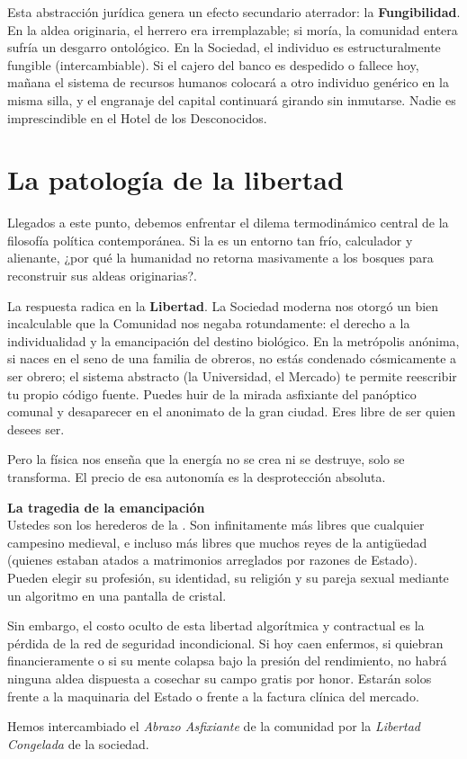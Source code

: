 Esta abstracción jurídica genera un efecto secundario aterrador: la \textbf{Fungibilidad}. En la aldea originaria, el herrero era irremplazable; si moría, la comunidad entera sufría un desgarro ontológico. En la Sociedad, el individuo es estructuralmente fungible (intercambiable). Si el cajero del banco es despedido o fallece hoy, mañana el sistema de recursos humanos colocará a otro individuo genérico en la misma silla, y el engranaje del capital continuará girando sin inmutarse. Nadie es imprescindible en el Hotel de los Desconocidos.

\section{La patología de la libertad}

Llegados a este punto, debemos enfrentar el dilema termodinámico central de la filosofía política contemporánea. Si la \Gesellschaft{} es un entorno tan frío, calculador y alienante, ¿por qué la humanidad no retorna masivamente a los bosques para reconstruir sus aldeas originarias?. 

La respuesta radica en la \textbf{Libertad}. La Sociedad moderna nos otorgó un bien incalculable que la Comunidad nos negaba rotundamente: el derecho a la individualidad y la emancipación del destino biológico. En la metrópolis anónima, si naces en el seno de una familia de obreros, no estás condenado cósmicamente a ser obrero; el sistema abstracto (la Universidad, el Mercado) te permite reescribir tu propio código fuente. Puedes huir de la mirada asfixiante del panóptico comunal y desaparecer en el anonimato de la gran ciudad. Eres libre de ser quien desees ser.

Pero la física nos enseña que la energía no se crea ni se destruye, solo se transforma. El precio de esa autonomía es la desprotección absoluta. 

\begin{argumento}
\textbf{La tragedia de la emancipación}\\
Ustedes son los herederos de la \Gesellschaft. Son infinitamente más libres que cualquier campesino medieval, e incluso más libres que muchos reyes de la antigüedad (quienes estaban atados a matrimonios arreglados por razones de Estado). Pueden elegir su profesión, su identidad, su religión y su pareja sexual mediante un algoritmo en una pantalla de cristal. 

Sin embargo, el costo oculto de esta libertad algorítmica y contractual es la pérdida de la red de seguridad incondicional. Si hoy caen enfermos, si quiebran financieramente o si su mente colapsa bajo la presión del rendimiento, no habrá ninguna aldea dispuesta a cosechar su campo gratis por honor. Estarán solos frente a la maquinaria del Estado o frente a la factura clínica del mercado. 

Hemos intercambiado el \textit{Abrazo Asfixiante} de la comunidad por la \textit{Libertad Congelada} de la sociedad.
\end{argumento}

